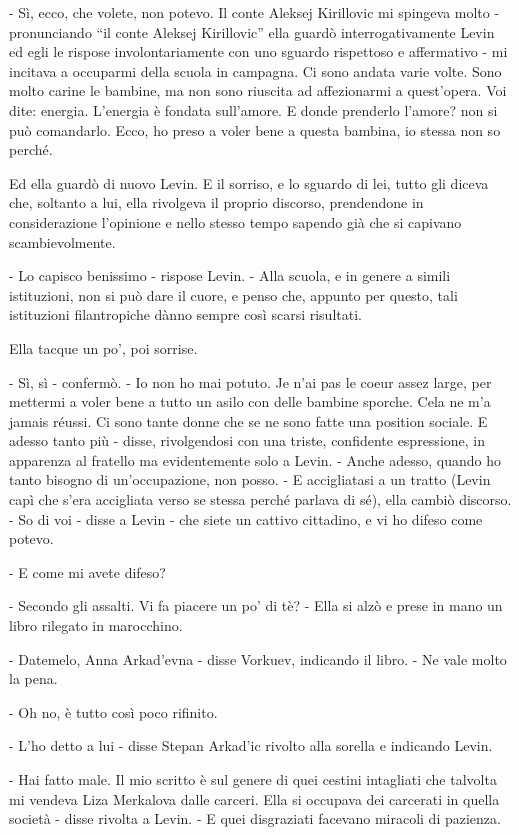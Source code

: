 - Sì, ecco, che volete, non potevo. Il conte Aleksej Kirillovic mi spingeva molto - pronunciando ``il conte Aleksej Kirillovic'' ella guardò interrogativamente Levin ed egli le rispose involontariamente con uno sguardo rispettoso e affermativo - mi incitava a occuparmi della scuola in campagna. Ci sono andata varie volte. Sono molto carine le bambine, ma non sono riuscita ad affezionarmi a quest'opera. Voi dite: energia. L'energia è fondata sull'amore. E donde prenderlo l'amore? non si può comandarlo. Ecco, ho preso a voler bene a questa bambina, io stessa non so perché. 

Ed ella guardò di nuovo Levin. E il sorriso, e lo sguardo di lei, tutto gli diceva che, soltanto a lui, ella rivolgeva il proprio discorso, prendendone in considerazione l'opinione e nello stesso tempo sapendo già che si capivano scambievolmente. 

- Lo capisco benissimo - rispose Levin. - Alla scuola, e in genere a simili istituzioni, non si può dare il cuore, e penso che, appunto per questo, tali istituzioni filantropiche dànno sempre così scarsi risultati. 

Ella tacque un po', poi sorrise. 

- Sì, sì - confermò. - Io non ho mai potuto. Je n'ai pas le coeur assez large, per mettermi a voler bene a tutto un asilo con delle bambine sporche. Cela ne m'a jamais réussi. Ci sono tante donne che se ne sono fatte una position sociale. E adesso tanto più - disse, rivolgendosi con una triste, confidente espressione, in apparenza al fratello ma evidentemente solo a Levin. - Anche adesso, quando ho tanto bisogno di un'occupazione, non posso. - E accigliatasi a un tratto (Levin capì che s'era accigliata verso se stessa perché parlava di sé), ella cambiò discorso. - So di voi - disse a Levin - che siete un cattivo cittadino, e vi ho difeso come potevo. 

- E come mi avete difeso? 

- Secondo gli assalti. Vi fa piacere un po' di tè? - Ella si alzò e prese in mano un libro rilegato in marocchino. 

- Datemelo, Anna Arkad'evna - disse Vorkuev, indicando il libro. - Ne vale molto la pena. 

- Oh no, è tutto così poco rifinito. 

- L'ho detto a lui - disse Stepan Arkad'ic rivolto alla sorella e indicando Levin. 

- Hai fatto male. Il mio scritto è sul genere di quei cestini intagliati che talvolta mi vendeva Liza Merkalova dalle carceri. Ella si occupava dei carcerati in quella società - disse rivolta a Levin. - E quei disgraziati facevano miracoli di pazienza. 

